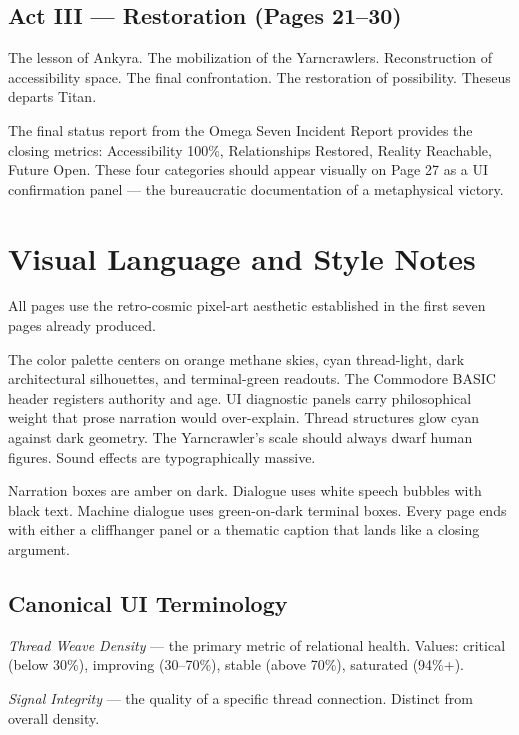 \documentclass[11pt]{article}
\begin{document}
\subsection{Act III --- Restoration (Pages 21--30)}

The lesson of Ankyra. The mobilization of the Yarncrawlers. Reconstruction of accessibility space. The final confrontation. The restoration of possibility. Theseus departs Titan.

The final status report from the Omega Seven Incident Report provides the closing metrics: Accessibility 100\%, Relationships Restored, Reality Reachable, Future Open. These four categories should appear visually on Page 27 as a UI confirmation panel --- the bureaucratic documentation of a metaphysical victory.

\section{Visual Language and Style Notes}

All pages use the retro-cosmic pixel-art aesthetic established in the first seven pages already produced.

The color palette centers on orange methane skies, cyan thread-light, dark architectural silhouettes, and terminal-green readouts. The Commodore BASIC header registers authority and age. UI diagnostic panels carry philosophical weight that prose narration would over-explain. Thread structures glow cyan against dark geometry. The Yarncrawler's scale should always dwarf human figures. Sound effects are typographically massive.

Narration boxes are amber on dark. Dialogue uses white speech bubbles with black text. Machine dialogue uses green-on-dark terminal boxes. Every page ends with either a cliffhanger panel or a thematic caption that lands like a closing argument.

\subsection{Canonical UI Terminology}

\textit{Thread Weave Density} --- the primary metric of relational health. Values: critical (below 30\%), improving (30--70\%), stable (above 70\%), saturated (94\%+).

\textit{Signal Integrity} --- the quality of a specific thread connection. Distinct from overall density.
\end{document}
